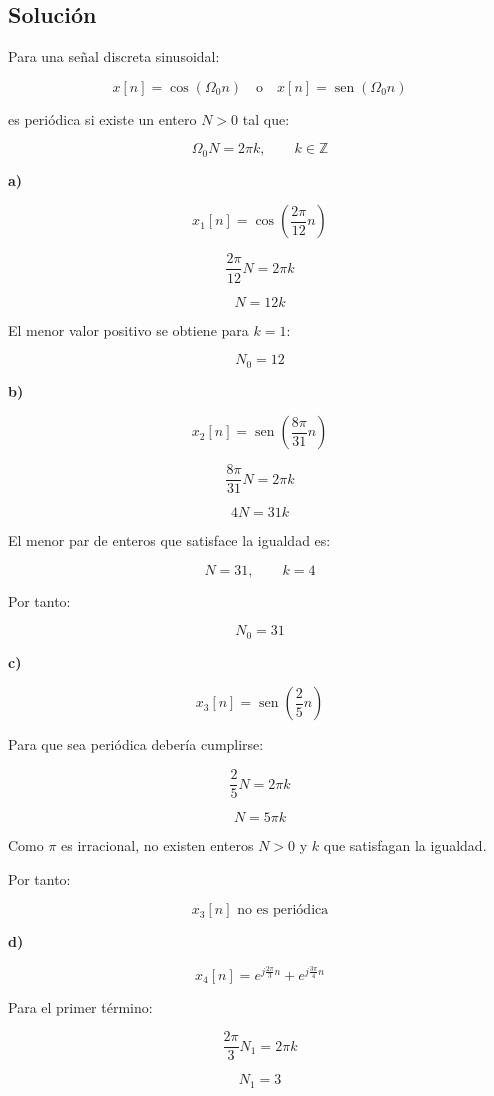 \documentclass[fleqn]{article}
\DeclareMathOperator{\sen}{sen}
\begin{document}
	\subsection{Solución}

	Para una señal discreta sinusoidal:

	\[
	x[n]=\cos(\Omega_0 n)
	\quad\text{o}\quad
	x[n]=\sen(\Omega_0 n)
	\]

	es periódica si existe un entero $N>0$ tal que:

	\[
	\Omega_0 N=2\pi k,
	\qquad k\in\mathbb{Z}
	\]

	\textbf{a)}

	\[
	x_1[n]
	=
	\cos\left(\frac{2\pi}{12}n\right)
	\]

	\[
	\frac{2\pi}{12}N
	=
	2\pi k
	\]

	\[
	N=12k
	\]

	El menor valor positivo se obtiene para $k=1$:

	\[
	\boxed{
	N_0=12
	}
	\]

	\textbf{b)}

	\[
	x_2[n]
	=
	\sen\left(\frac{8\pi}{31}n\right)
	\]

	\[
	\frac{8\pi}{31}N
	=
	2\pi k
	\]

	\[
	4N=31k
	\]

	El menor par de enteros que satisface la igualdad es:

	\[
	N=31,
	\qquad
	k=4
	\]

	Por tanto:

	\[
	\boxed{
	N_0=31
	}
	\]

	\textbf{c)}

	\[
	x_3[n]
	=
	\sen\left(\frac{2}{5}n\right)
	\]

	Para que sea periódica debería cumplirse:

	\[
	\frac{2}{5}N
	=
	2\pi k
	\]

	\[
	N=5\pi k
	\]

	Como $\pi$ es irracional, no existen enteros $N>0$ y $k$ que satisfagan la igualdad.

	Por tanto:

	\[
	\boxed{
	x_3[n]\text{ no es periódica}
	}
	\]

	\textbf{d)}

	\[
	x_4[n]
	=
	e^{j\frac{2\pi}{3}n}
	+
	e^{j\frac{3\pi}{4}n}
	\]

	Para el primer término:

	\[
	\frac{2\pi}{3}N_1
	=
	2\pi k
	\]

	\[
	N_1=3
	\]
\end{document}
